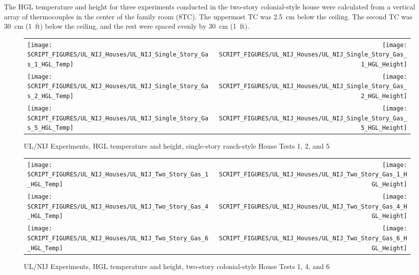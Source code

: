 The HGL temperature and height for three experiments conducted in the two-story colonial-style house were calculated from a vertical array of thermocouples in the center of the family room (8TC). The uppermost TC was 2.5~cm below the ceiling. The second TC was 30~cm (1~ft) below the ceiling, and the rest were spaced evenly by 30~cm (1~ft).

\newpage

\begin{figure}[p]
\begin{tabular*}{\textwidth}{l@{\extracolsep{\fill}}r}
\texttt{[image: SCRIPT\_FIGURES/UL\_NIJ\_Houses/UL\_NIJ\_Single\_Story\_Gas\_1\_HGL\_Temp]} &
\texttt{[image: SCRIPT\_FIGURES/UL\_NIJ\_Houses/UL\_NIJ\_Single\_Story\_Gas\_1\_HGL\_Height]} \\
\texttt{[image: SCRIPT\_FIGURES/UL\_NIJ\_Houses/UL\_NIJ\_Single\_Story\_Gas\_2\_HGL\_Temp]} &
\texttt{[image: SCRIPT\_FIGURES/UL\_NIJ\_Houses/UL\_NIJ\_Single\_Story\_Gas\_2\_HGL\_Height]} \\
\texttt{[image: SCRIPT\_FIGURES/UL\_NIJ\_Houses/UL\_NIJ\_Single\_Story\_Gas\_5\_HGL\_Temp]} &
\texttt{[image: SCRIPT\_FIGURES/UL\_NIJ\_Houses/UL\_NIJ\_Single\_Story\_Gas\_5\_HGL\_Height]} \\
\end{tabular*}
\caption{UL/NIJ Experiments, HGL temperature and height, single-story ranch-style House Tests 1, 2, and 5}
\label{UL_NIJ_HGL_1}
\end{figure}

\begin{figure}[p]
\begin{tabular*}{\textwidth}{l@{\extracolsep{\fill}}r}
\texttt{[image: SCRIPT\_FIGURES/UL\_NIJ\_Houses/UL\_NIJ\_Two\_Story\_Gas\_1\_HGL\_Temp]} &
\texttt{[image: SCRIPT\_FIGURES/UL\_NIJ\_Houses/UL\_NIJ\_Two\_Story\_Gas\_1\_HGL\_Height]} \\
\texttt{[image: SCRIPT\_FIGURES/UL\_NIJ\_Houses/UL\_NIJ\_Two\_Story\_Gas\_4\_HGL\_Temp]} &
\texttt{[image: SCRIPT\_FIGURES/UL\_NIJ\_Houses/UL\_NIJ\_Two\_Story\_Gas\_4\_HGL\_Height]} \\
\texttt{[image: SCRIPT\_FIGURES/UL\_NIJ\_Houses/UL\_NIJ\_Two\_Story\_Gas\_6\_HGL\_Temp]} &
\texttt{[image: SCRIPT\_FIGURES/UL\_NIJ\_Houses/UL\_NIJ\_Two\_Story\_Gas\_6\_HGL\_Height]} \\
\end{tabular*}
\caption{UL/NIJ Experiments, HGL temperature and height, two-story colonial-style House Tests 1, 4, and 6}
\label{UL_NIJ_HGL_2}
\end{figure}

